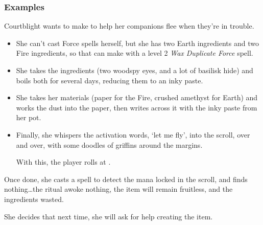 \begin{multicols}{2}
\subsubsection*{Examples}

\begin{exampletext}
Courtblight wants to make  to help her companions flee when they're in trouble.

\begin{itemize}
  \item
  She can't cast Force spells herself, but she has two Earth \glspl{ingredient} and two Fire \glspl{ingredient}, so that can make  with a level 2 \textit{Wax Duplicate Force} spell.
  \item
  She takes the \glspl{ingredient} (two woodspy eyes, and a lot of basilisk hide) and boils both for several days, reducing them to an inky paste.
  \item
  She takes her materials (paper for the Fire, crushed amethyst for Earth) and works the dust into the paper, then writes across it with the inky paste from her pot.
  \item
  Finally, she whispers the activation words, `let me fly', into the scroll, over and over, with some doodles of griffins around the margins.

  With this, the player rolls  at \tn[14].
\end{itemize}

Once done, she casts a spell to detect the mana locked in the scroll, and finds nothing\ldots the ritual awoke nothing, the item will remain fruitless, and the \glspl{ingredient} wasted.

She decides that next time, she will ask for help creating the item.

\end{exampletext}

\end{multicols}
